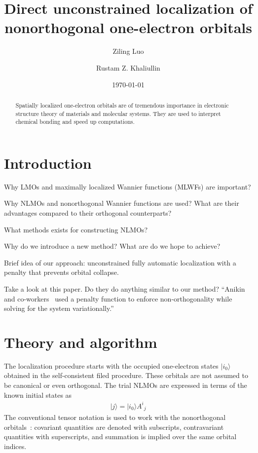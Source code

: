 \documentclass[aps,prl,reprint,amsmath,amssymb]{revtex4-1}
\newcommand{\ket}[1]{\ensuremath{\vert #1 \rangle}}
\begin{document}



\title{
Direct unconstrained localization of nonorthogonal one-electron orbitals
}

\author{Ziling Luo}
\author{Rustam Z. Khaliullin}

\date{\today}

\begin{abstract}
Spatially localized one-electron orbitals are of tremendous importance in electronic structure theory of materials and molecular systems. 
They are used to interpret chemical bonding and speed up computations. 
\end{abstract}

\maketitle

\section{Introduction} 

Why LMOs and maximally localized Wannier functions (MLWFs) are important?

Why NLMOs and nonorthogonal Wannier functions are used? What are their advantages compared to their orthogonal counterparts?

What methods exists for constructing NLMOs? 

Why do we introduce a new method? What are do we hope to achieve?

Brief idea of our approach: unconstrained fully automatic localization with a penalty that prevents orbital collapse.

Take a look at this paper. 
Do they do anything similar to our method? 
``Anikin and co-workers~\cite{anikin2004} used a penalty function to enforce non-orthogonality while solving for the system variationally.''


\section{Theory and algorithm}

The localization procedure starts with the occupied one-electron states $\ket{i_0}$ obtained in the self-consistent filed procedure. These orbitals are not assumed to be canonical or even orthogonal. The trial NLMOs are expressed in terms of the known initial states as
%
\begin{equation}
\begin{split}
\ket{j} = \ket{i_0} {A^i}_j  
\end{split}
\end{equation}
%
The conventional tensor notation is used to work with the nonorthogonal orbitals~\cite{head1998tensor}: covariant quantities are denoted with subscripts, contravariant quantities with superscripts, and summation is implied over the same orbital indices.
\end{document}

